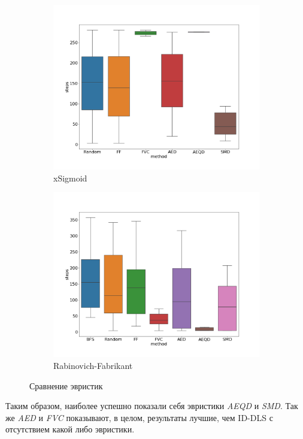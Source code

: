\begin{figure}[h]
\begin{subfigure}{.5\textwidth}
  \centering
  \includegraphics[width=1\linewidth, height=\linewidth]{chapters/images/xSigmoid/box.png}  
  \caption{xSigmoid}
\label{fig:xSigmoid-box}
\end{subfigure}
\begin{subfigure}{.5\textwidth}
  \centering
  \includegraphics[width=1\linewidth, height=\linewidth]{chapters/images/RabinovichFabricant/4.png}  
  \caption{Rabinovich-Fabrikant}
  \label{fig:Rabinovich-Fabricant-box}
\end{subfigure}
\caption{Сравнение эвристик}
\label{fig:box-plots}
\end{figure}

Таким образом, наиболее успешно показали себя эвристики \textit{AEQD} и \textit{SMD}. Так же \textit{AED} и \textit{FVC} показывают, в целом, результаты лучшие, чем ID-DLS с отсутствием какой либо эвристики. 
